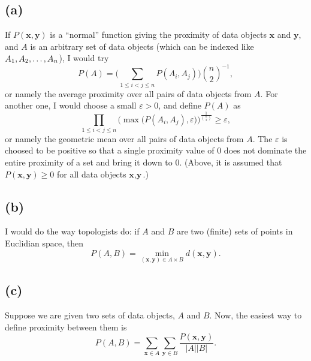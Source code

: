 \documentclass[10pt]{article}
\begin{document}
\subsection*{(a)}
If $P(\textbf{x}, \textbf{y})$ is a ``normal'' function giving the proximity of data objects $\textbf{x}$ and $\textbf{y}$, and $A$ is an arbitrary set of data objects (which can be indexed like $A_1, A_2, \dots,\\ A_n$), I would try 
\[
P(A) = \Bigg( \sum_{1 \leq i < j \leq n} P(A_i, A_j) \Bigg)\binom{n}{2}^{-1},
\]
or namely the average proximity over all pairs of data objects from $A$. For another one, I would choose a small $\varepsilon > 0$, and define $P(A)$ as
\[
\prod_{1 \leq i < j \leq n} \bigg( \max \big( P(A_i, A_j), \varepsilon \big) \bigg)^{ \frac{1}{\binom{n}{2}}} \geq \varepsilon,
\]
or namely the geometric mean over all pairs of data objects from $A$. The $\varepsilon$ is choosed to be positive so that a single proximity value of 0 does not dominate the entire proximity of a set and bring it down to 0. (Above, it is assumed that $P(\textbf{x}, \textbf{y}) \geq 0$ for all data objects $\textbf{x}, \textbf{y}$.)
 
\subsection*{(b)}
 I would do the way topologists do: if $A$ and $B$ are two (finite) sets of points in Euclidian space, then
 \[
 P(A, B) = \underset{(\textbf{x}, \textbf{y}) \in A \times B}{\min} d(\textbf{x}, \textbf{y}).
 \]
 
\subsection*{(c)}
Suppose we are given two sets of data objects, $A$ and $B$. Now, the easiest way to define proximity between them is
\[
P(A, B) = \sum_{\textbf{x} \in A} \sum_{\textbf{y} \in B} \frac{P(\textbf{x}, \textbf{y})}{|A||B|}.
\]  
\end{document}
